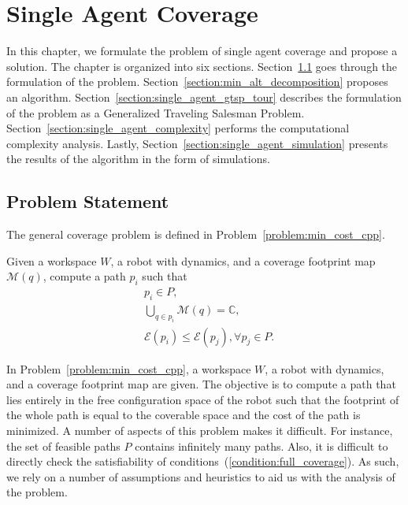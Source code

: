 \documentclass[../main.tex]{subfiles}
\begin{document}
\chapter{Single Agent Coverage}
\label{chapter:single_agent_coverage}

In this chapter, we formulate the problem of single agent coverage and propose a solution. The chapter is organized into six sections. Section~\ref{section:single_problem_statement} goes through the formulation of the problem. Section~\ref{section:min_alt_decomposition} proposes an algorithm. 
Section~\ref{section:single_agent_gtsp_tour} describes the formulation of the problem as a Generalized Traveling Salesman Problem. Section~\ref{section:single_agent_complexity} performs the computational complexity analysis. Lastly, Section~\ref{section:single_agent_simulation} presents the results of the algorithm in the form of simulations.

\section{Problem Statement}
\label{section:single_problem_statement}


The general coverage problem is defined in Problem~\ref{problem:min_cost_cpp}.
\begin{problem}
\label{problem:min_cost_cpp}
	Given a workspace $W$, a robot with dynamics, and a coverage footprint map $\mathcal{M}(q)$, compute a path $p_i$ such that
	\begin{equation}
	\label{condition:full_coverage}
	\begin{aligned}
		& p_i\in P,\\
		& \bigcup_{q\in p_i}\mathcal{M}(q)=\mathbb{C},\\
		& \mathcal{E}(p_i)\leq\mathcal{E}(p_j), \forall p_j\in P.
	\end{aligned}
	\end{equation}
\end{problem}

In Problem~\ref{problem:min_cost_cpp}, a workspace $W$, a robot with dynamics, and a coverage footprint map are given. The objective is to compute a path that lies entirely in the free configuration space of the robot such that the footprint of the whole path is equal to the coverable space and the cost of the path is minimized. A number of aspects of this problem makes it difficult. For instance, the set of feasible paths $P$ contains infinitely many paths. Also, it is difficult to directly check the satisfiability of conditions~(\ref{condition:full_coverage}). As such, we rely on a number of assumptions and heuristics to aid us with the analysis of the problem.
\end{document}
